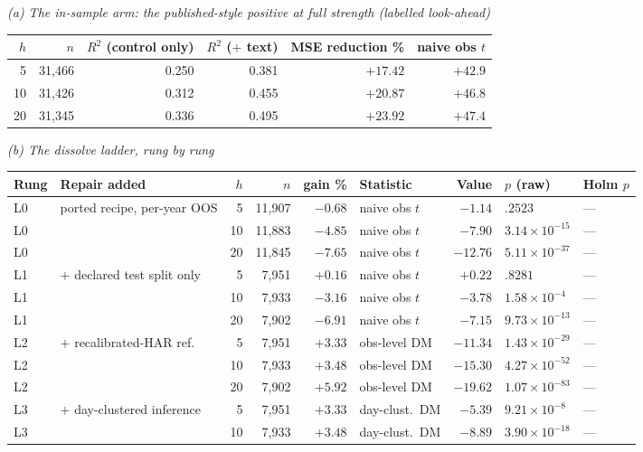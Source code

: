\begin{table}[p]
\emph{(a) The in-sample arm: the published-style positive at full strength (labelled look-ahead)}\\[0.4ex]
\begin{tabular}{@{}rrrrrr@{}}
\toprule
$h$ & $n$ & $R^2$ (control only) & $R^2$ ($+$ text) & MSE reduction \% & naive obs $t$ \\
\midrule
 5 & 31{,}466 & 0.250 & 0.381 & $+17.42$ & $+42.9$ \\
10 & 31{,}426 & 0.312 & 0.455 & $+20.87$ & $+46.8$ \\
20 & 31{,}345 & 0.336 & 0.495 & $+23.92$ & $+47.4$ \\
\bottomrule
\end{tabular}

\vspace{1.2ex}
\emph{(b) The dissolve ladder, rung by rung}\\[0.4ex]
\begin{tabular}{@{}llrrrlrll@{}}
\toprule
Rung & Repair added & $h$ & $n$ & gain \% & Statistic & Value & $p$ (raw) & Holm $p$ \\
\midrule
L0 & ported recipe, per-year OOS &  5 & 11{,}907 & $-0.68$ & naive obs $t$ & $-1.14$ & $.2523$ & --- \\
L0 & & 10 & 11{,}883 & $-4.85$ & naive obs $t$ & $-7.90$ & $3.14\times10^{-15}$ & --- \\
L0 & & 20 & 11{,}845 & $-7.65$ & naive obs $t$ & $-12.76$ & $5.11\times10^{-37}$ & --- \\
\addlinespace
L1 & $+$ declared test split only &  5 & 7{,}951 & $+0.16$ & naive obs $t$ & $+0.22$ & $.8281$ & --- \\
L1 & & 10 & 7{,}933 & $-3.16$ & naive obs $t$ & $-3.78$ & $1.58\times10^{-4}$ & --- \\
L1 & & 20 & 7{,}902 & $-6.91$ & naive obs $t$ & $-7.15$ & $9.73\times10^{-13}$ & --- \\
\addlinespace
L2 & $+$ recalibrated-HAR ref. &  5 & 7{,}951 & $+3.33$ & obs-level DM & $-11.34$ & $1.43\times10^{-29}$ & --- \\
L2 & & 10 & 7{,}933 & $+3.48$ & obs-level DM & $-15.30$ & $4.27\times10^{-52}$ & --- \\
L2 & & 20 & 7{,}902 & $+5.92$ & obs-level DM & $-19.62$ & $1.07\times10^{-83}$ & --- \\
\addlinespace
L3 & $+$ day-clustered inference &  5 & 7{,}951 & $+3.33$ & day-clust.\ DM & $-5.39$ & $9.21\times10^{-8}$ & --- \\
L3 & & 10 & 7{,}933 & $+3.48$ & day-clust.\ DM & $-8.89$ & $3.90\times10^{-18}$ & --- \\

\end{tabular}
\end{table}
